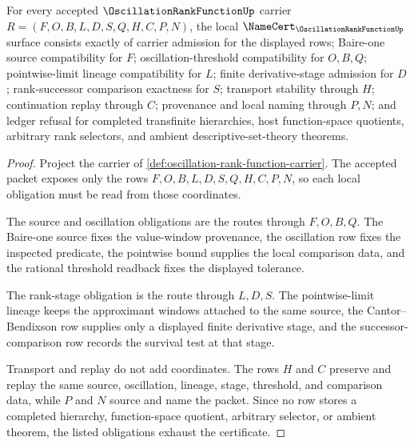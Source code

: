 \begin{theorem}
\label{thm:oscillation-rank-function-namecert-obligations}
For every accepted $\OscillationRankFunctionUp$ carrier $R=(F,O,B,L,D,S,Q,H,C,P,N)$, the local $\NameCert_{\OscillationRankFunctionUp}$ surface consists exactly of carrier admission for the displayed rows; Baire-one source compatibility for $F$; oscillation-threshold compatibility for $O,B,Q$; pointwise-limit lineage compatibility for $L$; finite derivative-stage admission for $D$; rank-successor comparison exactness for $S$; transport stability through $H$; continuation replay through $C$; provenance and local naming through $P,N$; and ledger refusal for completed transfinite hierarchies, host function-space quotients, arbitrary rank selectors, and ambient descriptive-set-theory theorems.
\end{theorem}
\begin{proof}
Project the carrier of \autoref{def:oscillation-rank-function-carrier}. The accepted packet exposes only the rows $F,O,B,L,D,S,Q,H,C,P,N$, so each local obligation must be read from those coordinates.

The source and oscillation obligations are the routes through $F,O,B,Q$. The Baire-one source fixes the value-window provenance, the oscillation row fixes the inspected predicate, the pointwise bound supplies the local comparison data, and the rational threshold readback fixes the displayed tolerance.

The rank-stage obligation is the route through $L,D,S$. The pointwise-limit lineage keeps the approximant windows attached to the same source, the Cantor--Bendixson row supplies only a displayed finite derivative stage, and the successor-comparison row records the survival test at that stage.

Transport and replay do not add coordinates. The rows $H$ and $C$ preserve and replay the same source, oscillation, lineage, stage, threshold, and comparison data, while $P$ and $N$ source and name the packet. Since no row stores a completed hierarchy, function-space quotient, arbitrary selector, or ambient theorem, the listed obligations exhaust the certificate.
\end{proof}

